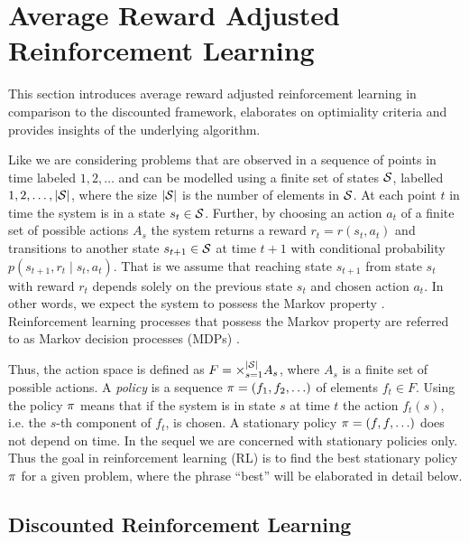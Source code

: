\documentclass[envcountsame]{llncs}
\newcommand\MS[2][r]{\ifx t#1 \textcolor{blue}{[\textbf{MS:} #2]}
  \else \begin{center}\textcolor{blue}{\textbf{MS:} #2} \end{center} \fi}
\begin{document}
\section{Average Reward Adjusted Reinforcement Learning}

This section introduces average reward adjusted reinforcement learning in comparison to the discounted
framework, elaborates on optimiality criteria and provides insights of the underlying algorithm.

Like \cite{MillerVeinott1969} we are considering problems that are observed in a sequence of points
in time labeled \(1,2,\ldots\) and can be modelled using a finite set of states \(\mathcal{S}\),
labelled \(1,2,\ldots,\lvert{\mathcal{S}}\rvert\), where the size \(\lvert{\mathcal{S}}\rvert\) is the number of elements
in \(\mathcal{S}\). At each point $t$ in time the system is in a state \(s_{t} \in \mathcal{S}\). Further,
by choosing an action $a_{t}$ of a finite set of possible actions \(A_{s}\) the system returns a
reward $r_{t} = r(s_{t}, a_{t})$ and transitions to another state \(s_{t+1} \in \mathcal{S}\) at time
\(t+1\) with conditional probability \(p(s_{t+1}, r_{t} \mid s_{t}, a_{t})\). That is we assume that
reaching state \(s_{t+1}\) from state \(s_{t}\) with reward \(r_{t}\) depends solely on the previous
state \(s_{t}\) and chosen action \(a_{t}\). In other words, we expect the system to possess the
Markov property \citep[p.63]{sutton1998introduction}. Reinforcement learning processes that possess
the Markov property are referred to as Markov decision processes (MDPs)
\citep[p.66]{sutton1998introduction}.

Thus, the action space is defined as \(F = \times_{s=1}^{\lvert{\mathcal{S}}\rvert} A_{s}\), where \(A_{s}\) is a
finite set of possible actions. A \emph{policy} is a sequence \(\pi = (f_{1},f_{2},\ldots)\) of
elements \(f_{t} \in F\). Using the policy \(\pi\) means that if the system is in state \(s\) at
time \(t\) the action \(f_{t}(s)\), i.e.%
the \(s\)-th component of \(f_{t}\), is chosen. A stationary policy \(\pi = (f,f,\ldots)\) does not
depend on time. In the sequel we are concerned with stationary policies only. Thus the goal in
reinforcement learning (RL) is to find the best stationary policy \(\pi\) for a given problem,
where the phrase ``best'' will be elaborated in detail below.


\subsection{Discounted Reinforcement Learning}
\label{subsec:Discounted_Reinforcement_Learning}
\end{document}
